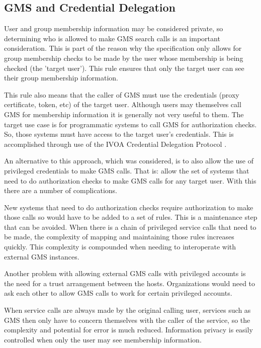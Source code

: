 \documentclass[11pt,a4paper]{ivoa}
\begin{document}
\subsection {GMS and Credential Delegation}
\label{subsec:creddel}

User and group membership information may be considered private, so determining who is allowed to make GMS search calls is an important consideration.  This is part of the reason why the specification only allows for group membership checks to be made by the user whose membership is being checked (the 'target user').  This rule ensures that only the target user can see their group membership information.

This rule also means that the caller of GMS must use the credentials (proxy certificate, token, etc) of the target user.  Although users may themselves call GMS for membership information it is generally not very useful to them.  The target use case is for programmatic systems to call GMS for authorization checks.  So, those systems must have access to the target user's credentials.  This is accomplished through use of the IVOA Credential Delegation Protocol \citep{2010ivoa.spec.0218P}.

An alternative to this approach, which was considered, is to also allow the use of privileged credentials to make GMS calls.  That is: allow the set of systems that need to do authorization checks to make GMS calls for any target user.  With this there are a number of complications.

New systems that need to do authorization checks require authorization to make those calls so would have to be added to a set of rules.  This is a maintenance step that can be avoided.  When there is a chain of privileged service calls that need to be made, the complexity of mapping and maintaining those rules increases quickly.  This complexity is compounded when needing to interoperate with external GMS instances.

Another problem with allowing external GMS calls with privileged accounts is the need for a trust arrangement between the hosts.  Organizations would need to ask each other to allow GMS calls to work for certain privileged accounts.

When service calls are always made by the original calling user, services such as GMS then only have to concern themselves with the caller of the service, so the complexity and potential for error is much reduced.  Information privacy is easily controlled when only the user may see membership information.
\end{document}
